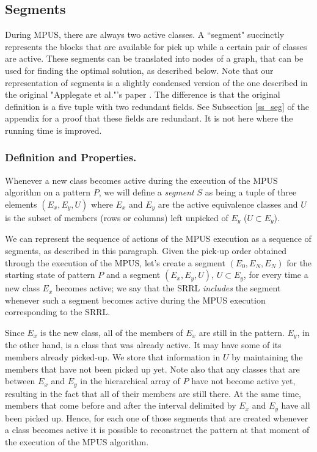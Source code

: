 \subsection{Segments}

During MPUS, there are always two active classes. A ``segment"
succinctly represents the blocks that are available for pick up
while a certain pair of classes are active.
These segments can be translated into nodes of a graph, that can be used for finding the optimal solution, as described below. Note that our representation of segments is a slightly condensed version of the one described in the original
"Applegate et al."'s paper \cite{ACJKLW07}. The difference is that
the original definition is a five tuple with two redundant fields.
See Subsection \ref{ss_seg} of the appendix for a proof that these fields are
redundant. It is not here where the running time is improved.

\subsubsection{Definition and Properties.}

Whenever a new class becomes active during the execution of the MPUS algorithm
 on a pattern $P$, we will define a {\em segment} $S$ as being a tuple of
three elements $(E_{x},E_{y},U)$ where $E_{x}$ and $E_{y}$ are the active
equivalence classes and $U$ is the subset of members (rows or columns)
 left unpicked of $E_{y}$ ($U \subset E_{y}$).

We can represent the sequence of actions of the MPUS execution as
a sequence of segments, as described in this paragraph.
 Given the pick-up order obtained through the execution of the MPUS,
let's create a segment $(E_{0}, E_{N}, E_{N})$ for the starting state of pattern $P$ and a segment $(E_{x}, E_{y}, U)$, $U \subset E_{y}$, for every time a new class $E_{x}$ becomes active; we say that the SRRL {\em includes} the
segment whenever such a segment becomes active during the MPUS execution
corresponding to the SRRL.

Since $E_{x}$ is the new class, all of the members of $E_{x}$ are still in the pattern. $E_{y}$, in the other hand, is a class that was already active. It may have some of its members already picked-up. We store that information in $U$ by maintaining the members that have not been picked up yet. Note also that any classes that are between $E_{x}$ and $E_{y}$ in the hierarchical array of $P$ have not become active yet, resulting in the fact that all of
their members are still there. At the same time, members that come before and after the interval delimited by $E_{x}$ and $E_{y}$ have all been picked up. Hence, for each one of those segments that are created whenever a class becomes active it is possible to reconstruct the pattern at that moment of the execution of the MPUS algorithm.

